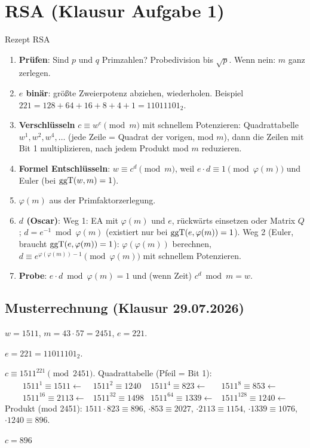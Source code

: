 \section{RSA (Klausur Aufgabe 1)}
\begin{rezept}{Rezept RSA}
\begin{enumerate}
\item \textbf{Prüfen}: Sind $p$ und $q$ Primzahlen? Probedivision bis $\sqrt{p}$. Wenn nein: $m$ ganz zerlegen.
\item \textbf{$e$ binär}: größte Zweierpotenz abziehen, wiederholen. Beispiel $221 = 128 + 64 + 16 + 8 + 4 + 1 = 11011101_2$.
\item \textbf{Verschlüsseln} $c \equiv w^e \pmod m$ mit schnellem Potenzieren:
  Quadrattabelle $w^1, w^2, w^4, \dots$ (jede Zeile = Quadrat der vorigen, mod $m$), dann die Zeilen mit Bit 1 multiplizieren,
  nach jedem Produkt mod $m$ reduzieren.
\item \textbf{Formel Entschlüsseln}: $w \equiv c^d \pmod m$, weil $e \cdot d \equiv 1 \pmod{\varphi(m)}$ und Euler (bei $\operatorname{ggT}(w, m) = 1$).
\item \textbf{$\varphi(m)$} aus der Primfaktorzerlegung.
\item \textbf{$d$ (Oscar)}: Weg 1: EA mit $\varphi(m)$ und $e$, rückwärts einsetzen oder Matrix $Q$; $d = e^{-1} \bmod \varphi(m)$ (existiert nur bei $\operatorname{ggT}(e, \varphi(m)) = 1$).
      Weg 2 (Euler, braucht $\operatorname{ggT}(e, \varphi(m)) = 1$): $\varphi(\varphi(m))$ berechnen, $d \equiv e^{\varphi(\varphi(m))-1} \pmod{\varphi(m)}$ mit schnellem Potenzieren.
\item \textbf{Probe}: $e \cdot d \bmod \varphi(m) = 1$ und (wenn Zeit) $c^d \bmod m = w$.
\end{enumerate}
\end{rezept}

\subsection*{Musterrechnung (Klausur 29.07.2026)}
$w = 1511$, $m = 43 \cdot 57 = 2451$, $e = 221$.

 $e = 221 = 11011101_2$.

 $c \equiv 1511^{221} \pmod{2451}$. Quadrattabelle (Pfeil = Bit 1):
\[
\begin{array}{llll}
1511^{1} \equiv 1511 \leftarrow & 1511^{2} \equiv 1240 & 1511^{4} \equiv 823 \leftarrow & 1511^{8} \equiv 853 \leftarrow\\
1511^{16} \equiv 2113 \leftarrow & 1511^{32} \equiv 1498 & 1511^{64} \equiv 1339 \leftarrow & 1511^{128} \equiv 1240 \leftarrow
\end{array}
\]
Produkt (mod 2451): $1511 \cdot 823 \equiv 896$, $\cdot 853 \equiv 2027$, $\cdot 2113 \equiv 1154$, $\cdot 1339 \equiv 1076$, $\cdot 1240 \equiv 896$.
\begin{ergebnis} $c = 896$ \end{ergebnis}

